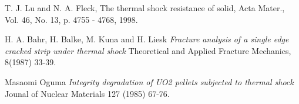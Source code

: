 \documentclass[12pt]{article}
\begin{document}
\begin{thebibliography}{9}
T. J. Lu and N. A. Fleck, The thermal shock resistance of solid, Acta Mater., Vol. 46, No. 13, p. 4755 - 4768, 1998.
 
H. A. Bahr, H. Balke, M. Kuna and H. Liesk
\textit{Fracture analysis of a single edge cracked strip under thermal shock}
Theoretical and Applied Fracture Mechanics, 8(1987) 33-39.
 
Masaomi Oguma
\textit{Integrity degradation of UO2 pellets subjected to thermal shock}
Jounal of Nuclear Materials 127 (1985) 67-76.
\end{thebibliography}
\end{document}
